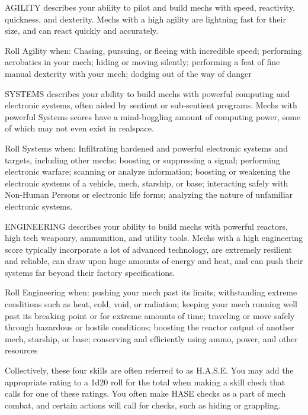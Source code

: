 AGILITY describes your ability to pilot and build mechs with speed, reactivity, quickness, and  
dexterity. Mechs with a high agility are lightning fast for their size, and can react quickly and  
accurately.  

Roll Agility when: Chasing, pursuing, or fleeing with incredible speed; performing acrobatics in  
your mech; hiding or moving silently; performing a feat of fine manual dexterity with your mech;  
dodging out of the way of danger  

SYSTEMS describes your ability to build mechs with powerful computing and electronic systems,  
often aided by sentient or sub-sentient programs. Mechs with powerful Systems scores have a  
mind-boggling amount of computing power, some of which may not even exist in realspace.  

Roll Systems when: Infiltrating hardened and powerful electronic systems and targets, including  
other mechs; boosting or suppressing a signal; performing electronic warfare; scanning or analyze  
information; boosting or weakening the electronic systems of a vehicle, mech, starship, or base;  
interacting safely with Non-Human Persons or electronic life forms; analyzing the nature of  
unfamiliar electronic systems.  

                                                                                                                     


ENGINEERING describes your ability to build mechs with powerful reactors, high tech weaponry,  
ammunition, and utility tools. Mechs with a high engineering score typically incorporate a lot of  
advanced technology, are extremely resilient and reliable, can draw upon huge amounts of energy  
and heat, and can push their systems far beyond their factory specifications.  

Roll Engineering when: pushing your mech past its limits; withstanding extreme conditions such  
as heat, cold, void, or radiation; keeping your mech running well past its breaking point or for  
extreme amounts of time; traveling or move safely through hazardous or hostile conditions;  
boosting the reactor output of another mech, starship, or base; conserving and efficiently using  
ammo, power, and other resources  

Collectively, these four skills are often referred to as H.A.S.E. You may add the appropriate rating  
to a 1d20 roll for the total when making a skill check that calls for one of these ratings. You often  
make HASE checks as a part of mech combat, and certain actions will call for checks, such as  
hiding or grappling.
 
